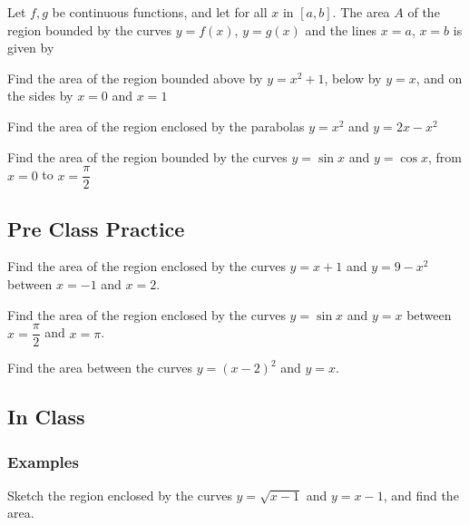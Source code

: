 \documentclass[notes]{subfiles}
\begin{document}
		\begin{thm}
			Let \(f,g\) be continuous functions, and let  for all \(x\) in \([a,b]\).  The area \(A\) of the region bounded by the curves \(y = f(x)\), \(y = g(x)\) and the lines \(x=a\), \(x=b\) is given by\vspace{.5in}
		\end{thm}
			
		\begin{ex}
			Find the area of the region bounded above by \(y = x^2+1\), below by \(y = x\), and on the sides by \(x = 0\) and \(x = 1\)
		\end{ex}
			\newpage
			
		\begin{ex}
			Find the area of the region enclosed by the parabolas \(y = x^2\) and \(y = 2x-x^2\)
		\end{ex}

			
		\begin{ex}
			Find the area of the region bounded by the curves \(y = \sin x\) and \(y = \cos x\), from \(x = 0\) to \(x = \dfrac{\pi}{2}\)
		\end{ex}
			\newpage
		
	\subsection*{Pre Class Practice}
	
		\begin{ex}
			Find the area of the region enclosed by the curves $y = x+1$ and $y = 9-x^2$ between $x = -1$ and $x=2$.
		\end{ex}
			
		\begin{ex}
			Find the area of the region enclosed by the curves $y = \sin x$ and $y = x$ between $x = \dfrac{\pi}{2}$ and $x = \pi$.
		\end{ex}
			
		\begin{ex}
			Find the area between the curves $y = (x-2)^2$ and $y = x$.
		\end{ex}
			\newpage
			
	\subsection*{In Class}
	\subsubsection*{Examples}	
		\begin{ex}
			Sketch the region enclosed by the curves \(y = \sqrt{x-1}\) and \(y=x-1\), and find the area.
		\end{ex}
			
\end{document}
